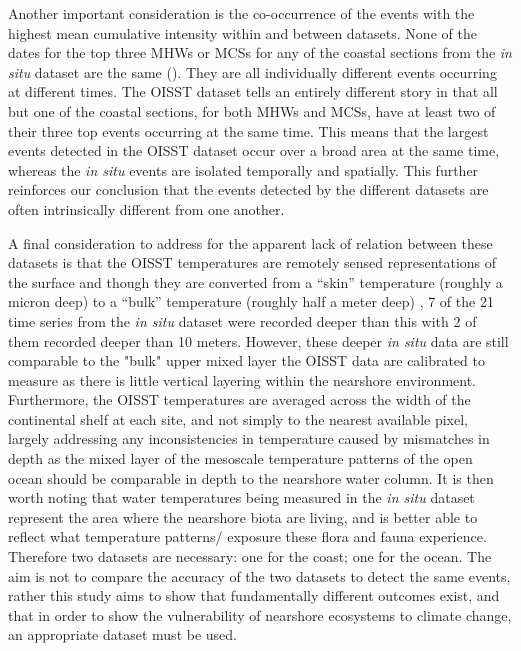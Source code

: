 \documentclass[a4paper,10pt,review]{elsarticle}
\begin{document}
Another important consideration is the co-occurrence of the events with the highest mean cumulative intensity within and between datasets. None of the dates for the top three MHWs or MCSs for any of the coastal sections from the \emph{in situ} dataset are the same (). They are all individually different events occurring at different times. The OISST dataset tells an entirely different story in that all but one of the coastal sections, for both MHWs and MCSs, have at least two of their three top events occurring at the same time. This means that the largest events detected in the OISST dataset occur over a broad area at the same time, whereas the \emph{in situ} events are isolated temporally and spatially. This further reinforces our conclusion that the events detected by the different datasets are often intrinsically different from one another.

A final consideration to address for the apparent lack of relation between these datasets is that the OISST temperatures are remotely sensed representations of the surface and though they are converted from a ``skin'' temperature (roughly a micron deep) to a ``bulk'' temperature (roughly half a meter deep) \citep{Reynolds2007}, 7 of the 21 time series from the \emph{in situ} dataset were recorded deeper than this with 2 of them recorded deeper than 10 meters. However, these deeper \emph{in situ} data are still comparable to the "bulk" upper mixed layer the OISST data are calibrated to measure as there is little vertical layering within the nearshore environment. Furthermore, the OISST temperatures are averaged across the width of the continental shelf at each site, and not simply to the nearest available pixel, largely addressing any inconsistencies in temperature caused by mismatches in depth as the mixed layer of the mesoscale temperature patterns of the open ocean should be comparable in depth to the nearshore water column. It is then worth noting that water temperatures being measured in the \emph{in situ} dataset represent the area where the nearshore biota are living, and is better able to reflect what temperature patterns/ exposure these flora and fauna experience. Therefore two datasets are necessary: one for the coast; one for the ocean. The aim is not to compare the accuracy of the two datasets to detect the same events, rather this study aims to show that fundamentally different outcomes exist, and that in order to show the vulnerability of nearshore ecosystems to climate change, an appropriate dataset must be used.
\end{document}
